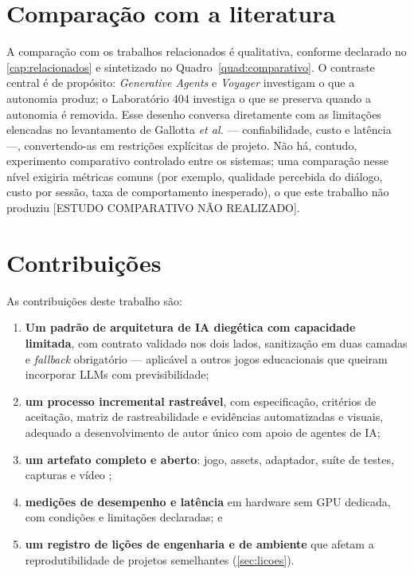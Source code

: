 \section{Comparação com a literatura}
\label{sec:comparacao}

A comparação com os trabalhos relacionados é qualitativa, conforme declarado
no \autoref{cap:relacionados} e sintetizado no Quadro~\ref{quad:comparativo}.
O contraste central é de propósito: \emph{Generative Agents}
\cite{park2023generative} e \emph{Voyager} \cite{wang2023voyager} investigam o
que a autonomia produz; o Laboratório 404 investiga o que se preserva quando
a autonomia é removida. Esse desenho conversa diretamente com as limitações
elencadas no levantamento de Gallotta \emph{et al.}
\cite{gallotta2024largelanguage} --- confiabilidade, custo e latência ---,
convertendo-as em restrições explícitas de projeto. Não há, contudo,
experimento comparativo controlado entre os sistemas; uma comparação nesse
nível exigiria métricas comuns (por exemplo, qualidade percebida do diálogo,
custo por sessão, taxa de comportamento inesperado), o que este trabalho não
produziu [ESTUDO COMPARATIVO NÃO REALIZADO].

\section{Contribuições}
\label{sec:contribuicoes}

As contribuições deste trabalho são:

\begin{enumerate}
  \item \textbf{Um padrão de arquitetura de IA diegética com capacidade
  limitada}, com contrato validado nos dois lados, sanitização em duas
  camadas e \emph{fallback} obrigatório --- aplicável a outros jogos
  educacionais que queiram incorporar LLMs com previsibilidade;
  \item \textbf{um processo incremental rastreável}, com especificação,
  critérios de aceitação, matriz de rastreabilidade e evidências automatizadas
  e visuais, adequado a desenvolvimento de autor único com apoio de agentes de
  IA;
  \item \textbf{um artefato completo e aberto}: jogo, assets, adaptador,
  suíte de testes, capturas e vídeo \cite{lab404repo,lab404video};
  \item \textbf{medições de desempenho e latência} em hardware sem GPU
  dedicada, com condições e limitações declaradas; e
  \item \textbf{um registro de lições de engenharia e de ambiente} que afetam
  a reprodutibilidade de projetos semelhantes (\autoref{sec:licoes}).
\end{enumerate}


